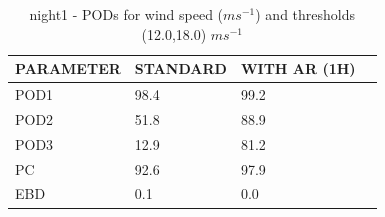 \begin{table}[h!]
\begin{center}
\begin{tabular}{|l|l|l|l|}
\hline
\multicolumn{1}{|c|}{\cellcolor[HTML]{C0C0C0}\textbf{PARAMETER}} & \multicolumn{1}{c|}{\cellcolor[HTML]{C0C0C0}\textbf{STANDARD}} & \multicolumn{1}{c|}{\cellcolor[HTML]{C0C0C0}\textbf{WITH AR (1H)}} \\
\hline
\cellcolor[HTML]{C0C0C0}POD1  & 98.4   & 99.2         \\
\cellcolor[HTML]{C0C0C0}POD2  & 51.8   & 88.9         \\
\cellcolor[HTML]{C0C0C0}POD3  & 12.9   & 81.2         \\
\cellcolor[HTML]{C0C0C0}PC    & 92.6     & 97.9           \\
\cellcolor[HTML]{C0C0C0}EBD   & 0.1    & 0.0          \\
\hline
\end{tabular}
\caption{night1 - PODs for wind speed ($m s^{-1}$) and thresholds (12.0,18.0) $m s^{-1}$}
\label{tab:podwsFT:night1}
\end{center}
\end{table}
